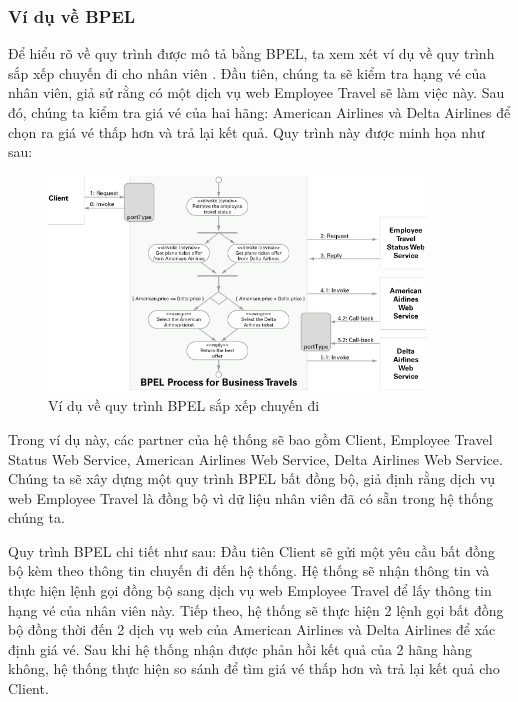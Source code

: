 \subsubsection{Ví dụ về BPEL}
 
\hspace*{0.5cm} Để hiểu rõ về quy trình được mô tả bằng BPEL, ta xem xét ví dụ về quy trình sắp xếp chuyến đi cho nhân viên \cite{theoryBPEL}. Đầu tiên, chúng ta sẽ kiểm tra hạng vé của nhân viên, giả sử rằng có một dịch vụ web Employee Travel sẽ làm việc này. Sau đó, chúng ta kiểm tra giá vé của hai hãng: American Airlines và Delta Airlines để chọn ra giá vé thấp hơn và trả lại kết quả. Quy trình này được minh họa như sau:
 
\begin{figure}[!htp]
    \begin{center}
        \includegraphics[width=10cm]{img/theory/BPEL/Sample.png}
    \end{center}
    \caption{Ví dụ về quy trình BPEL sắp xếp chuyến đi \cite{theoryBPEL}}
\end{figure}

Trong ví dụ này, các partner của hệ thống sẽ bao gồm Client, Employee Travel Status Web Service, American Airlines Web Service, Delta Airlines Web Service. Chúng ta sẽ xây dựng một quy trình BPEL bất đồng bộ, giả định rằng dịch vụ web Employee Travel là đồng bộ vì dữ liệu nhân viên đã có sẵn trong hệ thống chúng ta.
 
Quy trình BPEL chi tiết như sau: Đầu tiên Client sẽ gửi một yêu cầu bất đồng bộ kèm theo thông tin chuyến đi đến hệ thống. Hệ thống sẽ nhận thông tin và thực hiện lệnh gọi đồng bộ sang dịch vụ web Employee Travel để lấy thông tin hạng vé của nhân viên này. Tiếp theo, hệ thống sẽ thực hiện 2 lệnh gọi bất đồng bộ đồng thời đến 2 dịch vụ web của American Airlines và Delta Airlines để xác định giá vé. Sau khi hệ thống nhận được phản hồi kết quả của 2 hãng hàng không, hệ thống thực hiện so sánh để tìm giá vé thấp hơn và trả lại kết quả cho Client.

